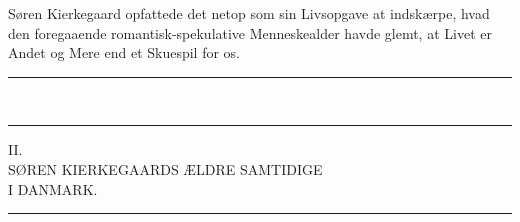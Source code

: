 \documentclass[12pt,a4paper,openany]{book}
\newcommand{\opage}[1]{\marginnote{\footnotesize\textit{[#1]}}}
\begin{document}
Søren Kierkegaard opfattede det netop som sin
Livsopgave at indskærpe, hvad den foregaaende romantisk-spekulative
Menneskealder havde glemt, at Livet er
Andet og Mere end et Skuespil for os.
\begin{center}\rule{2cm}{0.4pt}\\[-8pt]\rule{2cm}{0.4pt}\end{center}

\opage{16}\begin{center}II.\\[4pt] SØREN KIERKEGAARDS ÆLDRE SAMTIDIGE\\ I DANMARK.\\[4pt]\rule{1.5cm}{0.4pt}\end{center}
\end{document}
